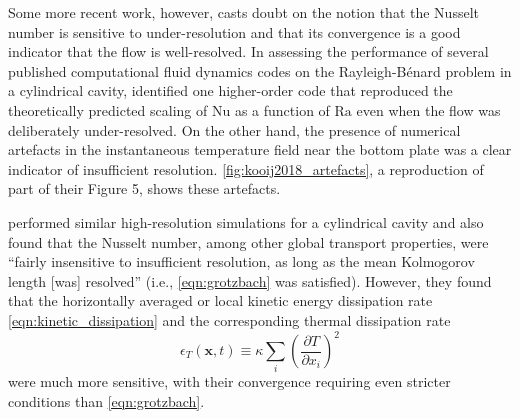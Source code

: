 \documentclass[titlepage,twoside]{article}
\numberwithin{equation}{section}
\newcommand{\pdiff}[2]{\frac{\partial #1}{\partial #2}}
\renewcommand\vec{\bm}
\newcommand{\rayleigh}{\ensuremath{\mathrm{Ra}}}
\newcommand{\nusselt}{\ensuremath{\mathrm{Nu}}}
\newcommand{\rb}{Rayleigh-B\'{e}nard}
\begin{document}
Some more recent work, however, casts doubt on the notion that the Nusselt
number is sensitive to under-resolution and that its convergence is a good
indicator that the flow is well-resolved. In assessing the performance of
several published computational fluid dynamics codes on the \rb{} problem in a
cylindrical cavity, \textcite{kooij2018} identified one higher-order code that
reproduced the theoretically predicted scaling of $\nusselt$ as a function of
$\rayleigh$ even when the flow was deliberately under-resolved. On the other
hand, the presence of numerical artefacts in the instantaneous temperature
field near the bottom plate was a clear indicator of insufficient resolution.
\cref{fig:kooij2018_artefacts}, a reproduction of part of their Figure 5, shows
these artefacts.

\textcite{scheel2013} performed similar high-resolution simulations for
a cylindrical cavity and also found that the Nusselt number, among other
global transport properties, were ``fairly insensitive to insufficient
resolution, as long as the mean Kolmogorov length [was] resolved'' (i.e.,
\cref{eqn:grotzbach} was satisfied). However, they found that the horizontally
averaged or local kinetic energy dissipation rate
\cref{eqn:kinetic_dissipation} and the corresponding thermal dissipation rate
\begin{equation}
    \label{eqn:thermal_dissipation}
    \epsilon_T(\vec{x}, t) \equiv \kappa \sum_i \left(\pdiff{T}{x_i}\right)^2
\end{equation}
were much more sensitive, with their convergence requiring even stricter
conditions than \cref{eqn:grotzbach}.
\end{document}
